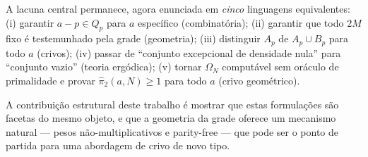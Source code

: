 \documentclass[12pt,a4paper]{article}
\theoremstyle{remark}
\begin{document}
	A lacuna central permanece, agora enunciada em \emph{cinco} linguagens equivalentes:
	(i) garantir $a-p\in Q_p$ para $a$ espec\'ifico (combinat\'oria);
	(ii) garantir que todo $2M$ fixo \'e testemunhado pela grade (geometria);
	(iii) distinguir $A_p$ de $A_p\cup B_p$ para todo $a$ (crivos);
	(iv) passar de ``conjunto excepcional de densidade nula'' para ``conjunto vazio''
	(teoria erg\'odica);
	(v) tornar $\Omega_N$ comput\'avel sem or\'aculo de primalidade e provar
	$\hat{\pi}_2(a,N)\geq 1$ para todo $a$ (crivo geom\'etrico).
	
	A contribui\c{c}\~ao estrutural deste trabalho \'e mostrar que estas formula\c{c}\~oes
	s\~ao facetas do mesmo objeto, e que a geometria da grade oferece um mecanismo
	natural --- pesos n\~ao-multiplicativos e parity-free ---
	que pode ser o ponto de partida para uma abordagem de crivo de novo tipo.
	
\end{document}
